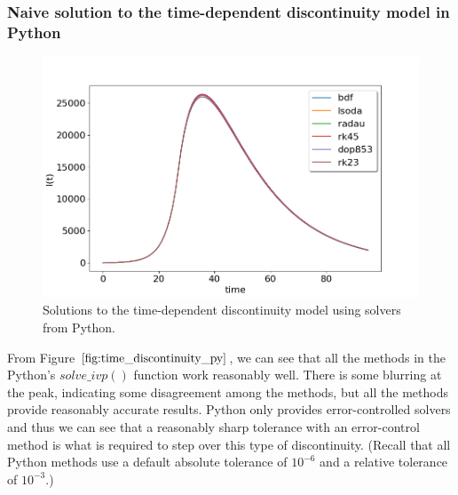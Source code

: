 \subsubsection{Naive solution to the time-dependent discontinuity model in Python}
\begin{figure}[H]
\centering
\includegraphics[width=0.7\linewidth]{./figures/time_discontinuity_py}
\caption{Solutions to the time-dependent discontinuity model using solvers from Python.}
\label{fig:time_discontinuity_py}
\end{figure}
From Figure $\ref{fig:time_discontinuity_py}$, we can see that all the methods in the Python's $solve\_ivp()$ function work reasonably well. There is some blurring at the peak, indicating some disagreement among the methods, but all the methods provide reasonably accurate results. Python only provides error-controlled solvers and thus we can see that a reasonably sharp tolerance with an error-control method is what is required to step over this type of discontinuity. (Recall that all Python methods use a default absolute tolerance of $10^{-6}$ and a relative tolerance of $10^{-3}$.)

